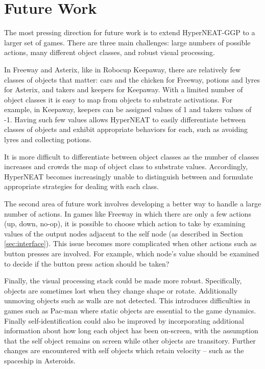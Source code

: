 \documentclass{sig-alternate}
\begin{document}
\section{Future Work}
\label{sec:futurework}
The most pressing direction for future work is to extend HyperNEAT-GGP to a larger set of games. There are three main challenges: large numbers of possible actions, many different object classes, and robust visual processing.

In Freeway and Asterix, like in Robocup Keepaway, there are relatively few classes of objects that matter: cars and the chicken for Freeway, potions and lyres for Asterix, and takers and keepers for Keepaway. With a limited number of object classes it is easy to map from objects to substrate activations. For example, in Keepaway, keepers can be assigned values of 1 and takers values of -1. Having such few values allows HyperNEAT to easily differentiate between classes of objects and exhibit appropriate behaviors for each, such as avoiding lyres and collecting potions.

It is more difficult to differentiate between object classes as the number of classes increases and crowds the map of object class to substrate values. Accordingly, HyperNEAT becomes increasingly unable to distinguish between and formulate appropriate strategies for dealing with each class.

The second area of future work involves developing a better way to handle a large number of actions. In games like Freeway in which there are only a few actions (up, down, no-op), it is possible to choose which action to take by examining values of the output nodes adjacent to the self node (as described in Section \ref{sec:interface}). This issue becomes more complicated when other actions such as button presses are involved. For example, which node's value should be examined to decide if the button press action should be taken? 

Finally, the visual processing stack could be made more robust. Specifically, objects are sometimes lost when they change shape or rotate. Additionally unmoving objects such as walls are not detected. This introduces difficulties in games such as Pac-man where static objects are essential to the game dynamics. Finally self-identification could also be improved by incorporating additional information about how long each object has been on-screen, with the assumption that the self object remains on screen while other objects are transitory. Further changes are encountered with self objects which retain velocity -- such as the spaceship in Asteroids. 
\end{document}
